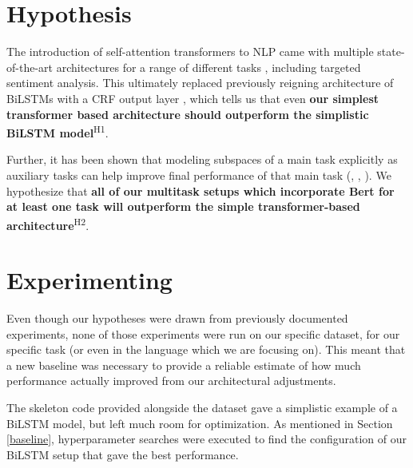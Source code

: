 \documentclass[11pt,a4paper]{article}
\begin{document}
\section{Hypothesis}
\label{hypothesis}
The introduction of self-attention transformers to NLP came with multiple state-of-the-art architectures for a range of different tasks \cite{devlin-etal-2019-bert}, including targeted sentiment analysis. This ultimately replaced previously reigning architecture of BiLSTMs with a CRF output layer \cite{HuangXY15}, which tells us that even \textbf{our simplest transformer based architecture should outperform the simplistic BiLSTM model}\textsuperscript{H1}.

Further, it has been shown that modeling subspaces of a main task explicitly as auxiliary tasks can help improve final performance of that main task (\citealt{Caruana1993MultitaskLA}, \citealt{ruder-etal-2019-transfer}, \citealt{MTLNEG}). We hypothesize that \textbf{all of our multitask setups which incorporate Bert for at least one task will outperform the simple transformer-based architecture}\textsuperscript{H2}.







\section{Experimenting}
\label{sec:Experimenting}
Even though our hypotheses were drawn from previously documented experiments, none of those experiments were run on our specific dataset, for our specific task (or even in the language which we are focusing on). This meant that a new baseline was necessary to provide a reliable estimate of how much performance actually improved from our architectural adjustments. 

The skeleton code provided alongside the dataset gave a simplistic example of a BiLSTM model, but left much room for optimization. As mentioned in Section \ref{baseline}, hyperparameter searches were executed to find the configuration of our BiLSTM setup that gave the best performance. 
\end{document}
